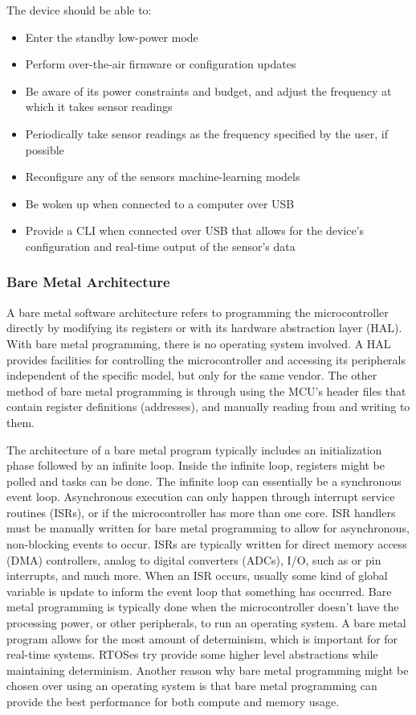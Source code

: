 The device should be able to:
\begin{itemize}
	\item Enter the standby low-power mode
	\item Perform over-the-air firmware or configuration updates
	\item Be aware of its power constraints and budget, and adjust the
		frequency at which it takes sensor readings
	\item Periodically take sensor readings as the frequency specified by the
		user, if possible
	\item Reconfigure any of the sensors machine-learning models
	\item Be woken up when connected to a computer over USB
	\item Provide a CLI when connected over USB that allows for the device's
		configuration and real-time output of the sensor's data
\end{itemize}

\subsubsection{Bare Metal Architecture}
A bare metal software architecture refers to programming the microcontroller
directly by modifying its registers or with its hardware abstraction layer
(HAL). With bare metal programming, there is no operating system involved. A
HAL provides facilities for controlling the microcontroller and accessing its
peripherals independent of the specific model, but only for the same vendor. The
other method of bare metal programming is through using the MCU's header files
that contain register definitions (addresses), and manually reading from and
writing to them. 

The architecture of a bare metal program typically includes an
initialization phase followed by an infinite loop. Inside the infinite loop,
registers might be polled and tasks can be done. The infinite loop can
essentially be a synchronous event loop. Asynchronous execution can only happen
through interrupt service routines (ISRs), or if the microcontroller has more
than one core. ISR handlers must be manually written for bare metal programming
to allow for asynchronous, non-blocking events to occur. ISRs are typically
written for direct memory access (DMA) controllers, analog to digital converters
(ADCs), I/O, such as \iic or pin interrupts, and much more. When an ISR occurs,
usually some kind of global variable is update to inform the event loop that
something has occurred. Bare metal programming is typically done when the
microcontroller doesn't have the processing power, or other peripherals, to run
an operating system. A bare metal program allows for the most amount of
determinism, which is important for for real-time systems. RTOSes try provide
some higher level abstractions while maintaining determinism. Another reason why
bare metal programming might be chosen over using an operating system is that
bare metal programming can provide the best performance for both compute and
memory usage.

